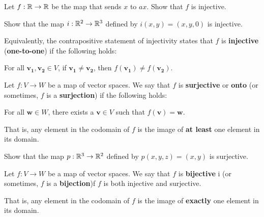\begin{example}
    Let $f: \mathbb{R} \to \mathbb{R}$ be the map that sends $x$ to $ax$. Show that $f$ is injective.
\end{example}


\begin{example}
Show that the map $i: \mathbb{R}^2 \to \mathbb{R}^3$ defined by $i(x,y) = (x,y,0)$ is injective.
\end{example}

\begin{example}
    Equivalently, the contrapositive statement of injectivity states that $f$ is \textbf{injective} (\textbf{one-to-one}) if the following holds:
    
    \begin{center}
    For all $\bm{v_1}, \bm{v_2} \in V$, if $\bm{v_1} \neq \bm{v_2}$, then $f(\bm{v_1}) \neq f(\bm{v_2})$.
        
    \end{center}
    
\end{example}

\begin{definition}
    Let $f: V \to W$ be a map of vector spaces.  We say that $f$ is \textbf{surjective} or \textbf{onto}  (or sometimes, $f$ is a \textbf{surjection}) if the following holds:
    
    \begin{center}
        
    For all $\bm{w} \in W$, there exists a $\bm{v} \in V$ such that $f(\bm{v}) = \bm{w}$.
    \end{center}
    
    That is, any element in the codomain of $f$ is the image of \textbf{at least} one element in its domain.  
\end{definition}

\begin{example}
Show that the map $p: \mathbb{R}^3 \to \mathbb{R}^2$ defined by $p(x,y,z) = (x,y)$ is surjective.
\end{example}

\begin{definition}
    Let $f: V \to W$ be a map of vector spaces.  We say that $f$ is \textbf{bijective} i  (or sometimes, $f$ is a \textbf{bijection})f $f$ is both injective and surjective.
    
    That is, any element in the codomain of $f$ is the image of \textbf{exactly} one element in its domain.  
\end{definition}





